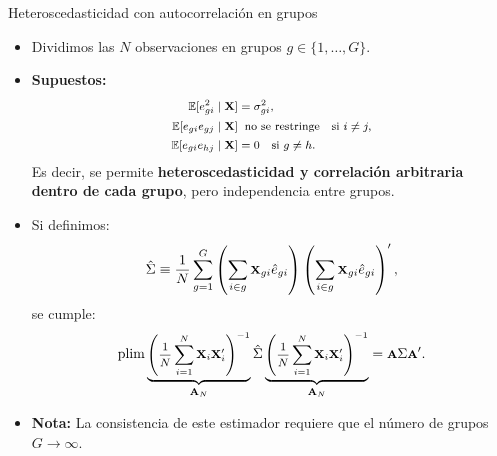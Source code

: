 \documentclass[10pt, xcolor=dvipsnames]{beamer}
\begin{document}
\begin{frame}{Heteroscedasticidad con autocorrelación en grupos}
\begin{itemize}
    \item Dividimos las \(N\) observaciones en grupos \(g \in \{1, \ldots, G\}\). \pause
    \vspace{0.5em}
    \item \textbf{Supuestos:}
    \vspace{-1.3em}
    \begin{align*}
    \footnotesize
    \begin{split}
    \operatorname{\mathbb{E}}[e_{gi}^2 \mid \textbf{X}] &= \sigma^2_{gi}, \\
    \operatorname{\mathbb{E}}[e_{gi} e_{gj} \mid \textbf{X}] &\;\;\text{no se restringe} \quad \text{si } i \neq j, \\
    \operatorname{\mathbb{E}}[e_{gi} e_{hj} \mid \textbf{X}] &= 0 \quad \text{si } g \neq h.
    \end{split}
    \end{align*}
    Es decir, se permite \textbf{heteroscedasticidad y correlación arbitraria dentro de cada grupo}, pero independencia entre grupos. \pause
    \vspace{0.5em}
    \item Si definimos:
    \vspace{-1em}
    \begin{align*}    
    \footnotesize
        \hat{\Sigma} \equiv \frac{1}{N} \sum_{g=1}^{G} \left( \sum_{i \in g} \textbf{X}_{gi}\hat{e}_{gi} \right)
        \left( \sum_{i \in g} \textbf{X}_{gi}\hat{e}_{gi} \right)',
    \end{align*}
    \vspace{-0.25em}
    \pause
    se cumple:
    \vspace{-1em}
    \begin{align*}
    \footnotesize
        \plim \underbrace{\left(\frac{1}{N}\sum_{i=1}^{N} \XB_i \XB'_i \right)^{-1}}_{\textbf{A}_N}
        \hat{\Sigma}
        \underbrace{\left(\frac{1}{N}\sum_{i=1}^{N} \XB_i \XB'_i \right)^{-1}}_{\textbf{A}_N} = \AB \Sigma \AB'.
    \end{align*}
    \vspace{-0.5em}
    \item \textbf{Nota:} La consistencia de este estimador requiere que el número de grupos \(G \to \infty\).
\end{itemize}
\end{frame}
\end{document}

